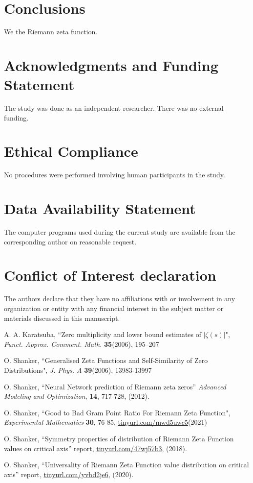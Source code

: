 \documentclass[twoside]{article}
\begin{document}
\section{\label{conclusions}Conclusions}

We the Riemann zeta function.

\section*{Acknowledgments and Funding Statement}

 The study was done as an independent researcher. There was no
external funding.

\section*{Ethical Compliance}

 No procedures were performed  involving human participants in the study.

\section*{Data Availability Statement}

The computer programs used during the current study are
available from the corresponding author on reasonable request.

\section*{Conflict of Interest declaration} 

The authors declare that they have no affiliations with or involvement in any organization 
or entity with any financial interest in the subject matter or materials discussed 
in this manuscript.



\begin{thebibliography}{10}

 A. A. Karatsuba, 
``Zero multiplicity and lower bound estimates of $|\zeta(s)|$",
{\it Funct.  Approx. Comment. Math.} {\bf35}(2006), 195–207

 O. Shanker, 
``Generalised Zeta Functions and Self-Similarity of Zero Distributions",
{\it J.  Phys. A} {\bf39}(2006), 13983-13997

 O. Shanker, ``Neural Network prediction of Riemann zeta zeros''
{\it Advanced Modeling and Optimization}, {\bf 14}, 717-728, (2012). 

 O. Shanker, 
``Good to Bad Gram Point Ratio For Riemann Zeta Function",
{\it Experimental Mathematics} {\bf 30}, 76-85,
\url{tinyurl.com/mwd5uwc5}(2021)

 O. Shanker, 
``Symmetry properties of distribution of Riemann Zeta Function values on critical axis''
 report,
\url{tinyurl.com/47wj57b3}, 
(2018). 

 O. Shanker, 
``Universality of Riemann Zeta Function value distribution on critical axis''
 report,
\url{tinyurl.com/yvbd2je6}, 
(2020). 




\end{thebibliography} 
\end{document}

